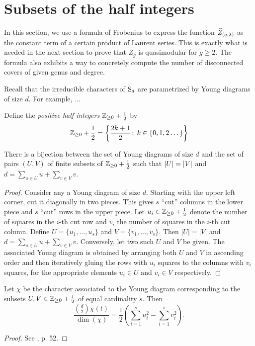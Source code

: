 \section{Subsets of the half integers}

In this section, we use a formula of Frobenius to express the function $\widehat{Z}_{(q,\lambda)}$ as the constant term of a certain product of Laurent series. This is exactly what is needed in the next section to prove that ${Z}_g$ is quasimodular for $g\geq 2$. The formula also exhibits a way to concretely compute the number of disconnected covers of given genus and degree.

Recall that the irreducible characters of $\operatorname{S}_d$ are parametrized by Young diagrams of size $d$. For example, ...

\begin{defi}
 Define the \emph{positive half integers} $\mathbb{Z}_{\geq0}+\frac{1}{2}$ by
 \[
  \mathbb{Z}_{\geq 0}+\frac{1}{2}=\left\{\frac{2k+1}{2}\,;\; k\in\{0,1,2\dotsc\}\right\}
 \]
\end{defi}

\begin{prop}
 There is a bijection between the set of Young diagrams of size $d$ and the set of pairs $(U,V)$ of finite subsets of $\mathbb{Z}_{\geq 0}+\frac{1}{2}$ such that $|U|=|V|$ and $d=\sum_{u\in U}u + \sum_{v\in V}v$.
\end{prop}
\begin{proof}
 Consider any a Young diagram of size $d$. Starting with the upper left corner, cut it diagonally in two pieces. This gives $s$ ``cut'' columns in the lower piece and $s$ ``cut'' rows in the upper piece. Let $u_i\in\mathbb{Z}_{\geq 0}+\frac{1}{2}$ denote the number of squares in the $i$-th cut row and $v_i$ the number of squares in the $i$-th cut column. Define $U=\{u_1,\dotsc,u_s\}$ and $V=\{v_1,\dotsc,v_s\}$. Then $|U|=|V|$ and $d=\sum_{u\in U}u + \sum_{v\in V}v$. Conversely, let two such $U$ and $V$ be given. The associated Young diagram is obtained by arranging both $U$ and $V$ in ascending order and then iteratively gluing the rows with $u_i$ squares to the columns with $v_i$ squares, for the appropriate elements $u_i \in U$ and $v_i \in V$ respectively.
\end{proof}

\begin{prop}
 Let $\chi$ be the character associated to the Young diagram corresponding to the subsets $U,V\in\mathbb{Z}_{\geq 0}+\frac{1}{2}$ of equal cardinality $s$. Then
 \[
  \frac{\binom{d}{2} \chi(t)}{\dim(\chi)} = \frac{1}{2}\left(\sum_{i=1}^s u_i^2 - \sum_{i=1}^s v_i^2\right).
 \]
\end{prop}
\begin{proof}
 See \cite{Fulton-Harris91}, p. 52.
\end{proof}

